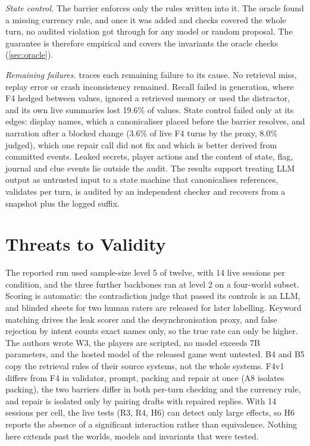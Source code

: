 \documentclass[letterpaper,journal]{IEEEtran}
\begin{document}
\emph{State control.} The barrier enforces only the rules written into it. The oracle found a missing currency rule, and once it was added and checks covered the whole turn, no audited violation got through for any model or random proposal. The guarantee is therefore empirical and covers the invariants the oracle checks (\cref{sec:oracle}).

\emph{Remaining failures.}  traces each remaining failure to its cause. No retrieval miss, replay error or crash inconsistency remained. Recall failed in generation, where F4 hedged between values, ignored a retrieved memory or used the distractor, and its own live summaries lost 19.6\% of values. State control failed only at its edges: display names, which a canonicaliser placed before the barrier resolves, and narration after a blocked change (3.6\% of live F4 turns by the proxy, 8.0\% judged), which one repair call did not fix and which is better derived from committed events. Leaked secrets, player actions and the content of state, flag, journal and clue events lie outside the audit. The results support treating LLM output as untrusted input to a state machine that canonicalises references, validates per turn, is audited by an independent checker and recovers from a snapshot plus the logged suffix.

\section{Threats to Validity}\label{sec:limits}

The reported run used sample-size level 5 of twelve, with 14 live sessions per condition, and the three further backbones ran at level 2 on a four-world subset. Scoring is automatic: the contradiction judge that passed its controls is an LLM, and blinded sheets for two human raters are released for later labelling. Keyword matching drives the leak scorer and the desynchronisation proxy, and false rejection by intent counts exact names only, so the true rate can only be higher. The authors wrote W3, the players are scripted, no model exceeds 7B parameters, and the hosted model of the released game went untested. B4 and B5 copy the retrieval rules of their source systems, not the whole systems. F4v1 differs from F4 in validator, prompt, packing and repair at once (A8 isolates packing), the two barriers differ in both per-turn checking and the currency rule, and repair is isolated only by pairing drafts with repaired replies. With 14 sessions per cell, the live tests (R3, R4, H6) can detect only large effects, so H6 reports the absence of a significant interaction rather than equivalence. Nothing here extends past the worlds, models and invariants that were tested.
\end{document}
